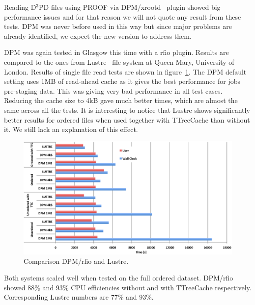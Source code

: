 \documentclass[a4paper]{jpconf}
\begin{document}
Reading D$^3$PD files using PROOF via DPM/xrootd~\cite{xrd} plugin showed big performance issues and for that reason we will not quote any result from these tests. DPM was never before used in this way but since major problems are already identified, we expect the new version to address them. 

DPM was again tested in Glasgow this time with a rfio plugin. Results are compared to the ones from Lustre~\cite{lustre} file system at Queen Mary, University of London. Results of single file read tests are shown in figure~\ref{fig_DPM_LUSTRE}. The DPM default setting uses 1MB of read-ahead cache as it gives the best performance for jobs pre-staging data. This was giving very bad performance in all test cases. Reducing the cache size to 4kB gave much better times, which are almost the same across all the tests. It is interesting to notice that Lustre shows significantly better results for ordered files when used together with TTreeCache than without it. We still lack an explanation of this effect.

\begin{figure}[h]
\begin{center}	
\includegraphics[scale=0.6]{wahid.eps}
\end{center}
\caption{\label{fig_DPM_LUSTRE}Comparison DPM/rfio and Lustre. }
\end{figure}

Both systems scaled well when tested on the full ordered dataset. DPM/rfio showed 88\% and 93\% CPU efficiencies without and with TTreeCache respectively. Corresponding Lustre numbers are 77\% and 93\%.   
\end{document}
